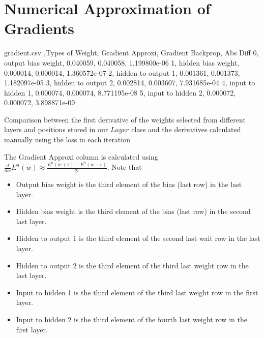 \documentclass{article}
\begin{document}
    \section{Numerical Approximation of Gradients}\label{sec:numerical-approximation-of-gradients}

    \begin{filecontents*}{gradient.csv}
        ,Types of Weight,  Gradient Approxi,  Gradient Backprop,      Abs Diff
        0,  output bias weight,          0.040059,           0.040058,  1.199800e-06
        1,  hidden bias weight,          0.000014,           0.000014,  1.360572e-07
        2,  hidden to output 1,          0.001361,           0.001373,  1.182097e-05
        3,  hidden to output 2,          0.002814,           0.003607,  7.931685e-04
        4,   input to hidden 1,          0.000074,           0.000074,  8.771195e-08
        5,   input to hidden 2,          0.000072,           0.000072,  3.898871e-09
    \end{filecontents*}

    \begin{table}[H]
        \centering
        \caption{Comparison between the first derivative of the weights selected from different layers and positions stored in our $Layer$ class and the derivatives calculated manually using the loss in each iteration}\label{tab:hp_05}
    \end{table}

    The Gradient Approxi column is calculated using
    $\frac{d}{dw}E^n(w)\approx\frac{E^n(w+\epsilon)-E^n(w-\epsilon)}{2\epsilon}$. Note that
    \begin{itemize}
    \item Output bias weight is the third element of the bias (last row) in the last layer. \\
    \item Hidden bias weight is the third element of the bias (last row) in the second last layer. \\
    \item Hidden to output 1 is the third element of the second last wait row in the last layer. \\
    \item Hidden to output 2 is the third element of the third last weight row in the last layer. \\
    \item Input to hidden 1 is the third element of the third last weight row in the first layer. \\
    \item Input to hidden 2 is the third element of the fourth last weight row in the first layer. \\
    \end{itemize}
\end{document}
